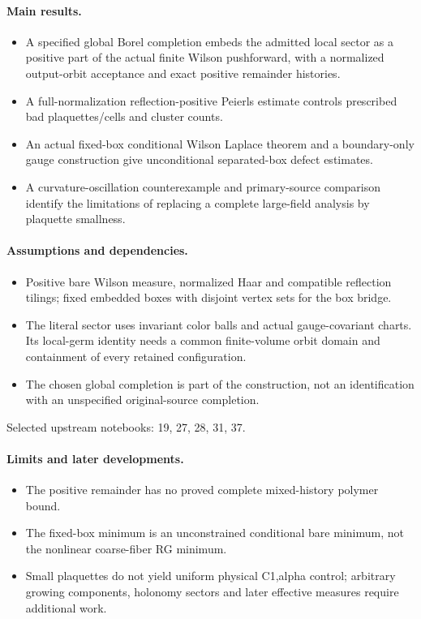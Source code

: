 \paragraph{Main results.}
\begin{itemize}
\item A specified global Borel completion embeds the admitted local sector as a positive part of the actual finite Wilson pushforward, with a normalized output-orbit acceptance and exact positive remainder histories.
\item A full-normalization reflection-positive Peierls estimate controls prescribed bad plaquettes/cells and cluster counts.
\item An actual fixed-box conditional Wilson Laplace theorem and a boundary-only gauge construction give unconditional separated-box defect estimates.
\item A curvature-oscillation counterexample and primary-source comparison identify the limitations of replacing a complete large-field analysis by plaquette smallness.
\end{itemize}

\paragraph{Assumptions and dependencies.}
\begin{itemize}
\item Positive bare Wilson measure, normalized Haar and compatible reflection tilings; fixed embedded boxes with disjoint vertex sets for the box bridge.
\item The literal sector uses invariant color balls and actual gauge-covariant charts. Its local-germ identity needs a common finite-volume orbit domain and containment of every retained configuration.
\item The chosen global completion is part of the construction, not an identification with an unspecified original-source completion.
\end{itemize}

Selected upstream notebooks: 19, 27, 28, 31, 37.\par

\paragraph{Limits and later developments.}
\begin{itemize}
\item The positive remainder has no proved complete mixed-history polymer bound.
\item The fixed-box minimum is an unconstrained conditional bare minimum, not the nonlinear coarse-fiber RG minimum.
\item Small plaquettes do not yield uniform physical C1,alpha control; arbitrary growing components, holonomy sectors and later effective measures require additional work.
\end{itemize}

